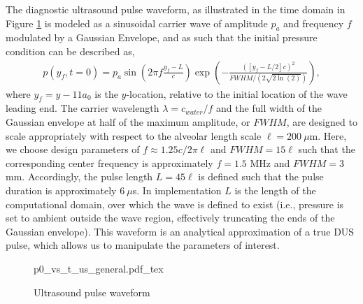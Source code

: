 % 
The diagnostic ultrasound pulse waveform, as illustrated in the time
domain in Figure \ref{fig:p0_ultrasound} is modeled as a sinusoidal
carrier wave of amplitude $p_a$ and frequency $f$ modulated by a
Gaussian Envelope, and as such that the initial pressure condition can
be described as,
\begin{align}
  p(y_f,t=0) = p_a\sin{\left(2\pi f\frac{y_f-L}{c}\right)}\exp{\left(-\frac{\left(\left[y_f-L/2\right]c\right)^2}{FWHM/\left(2\sqrt{2\ln{\left(2\right)}} \right)}\right)},%
\end{align}
where $y_f = y - 11a_0$ is the $y$-location, relative to the initial
location of the wave leading end. The carrier wavelength
$\lambda=c_{water}/f$ and the full width of the Gaussian envelope at
half of the maximum amplitude, or $FWHM$, are designed to scale
appropriately with respect to the alveolar length scale
$\ell=200~\mu$m. Here, we choose design parameters of
$f\approx 1.25 c / 2\pi \ell$ and $FWHM=15\ell$ such that the
corresponding center frequency is approximately $f=1.5$ MHz and
$FWHM=3$ mm. Accordingly, the pulse length $L=45\ell$ is defined such
that the pulse duration is approximately $6~\mu$s. In implementation
$L$ is the length of the computational domain, over which the wave is
defined to exist (i.e., pressure is set to ambient outside the wave
region, effectively truncating the ends of the Gaussian
envelope). This waveform is an analytical approximation of a true
\ac{DUS} pulse, which allows us to manipulate the parameters of
interest. %
\begin{figure}
  \centering {}
  {p0_vs_t_us_general.pdf_tex}%
  \caption[Ultrasound pulse waveform]{Ultrasound pulse waveform}
  \label{fig:p0_ultrasound}%
\end{figure}%

